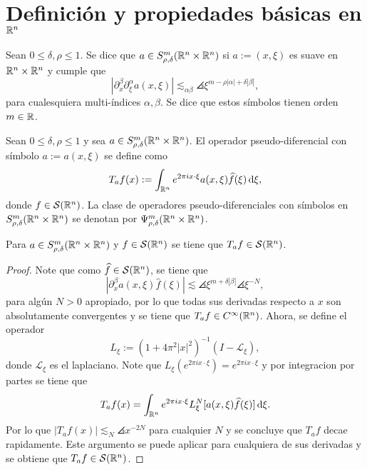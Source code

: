 \section{Definición y propiedades básicas en $\mathbb{R}^n$}
\begin{definition}
	Sean $0\leq\delta,\rho\leq1$. Se dice que $a \in S^m_{\rho,\delta}(\mathbb{R}^n\times\mathbb{R}^n)$ si $a:=(x,\xi)$ es suave en $\mathbb{R}^n\times\mathbb{R}^n$ y cumple que
	\begin{equation*}
		|\partial^\beta_x\partial^\alpha_\xi a(x, \xi)| \lesssim_{\alpha\beta}\angles{\xi}^{m-\rho|\alpha|+\delta|\beta|},
	\end{equation*}
	para cualesquiera multi-índices $\alpha,\beta$. Se dice que estos símbolos tienen orden $m\in\mathbb{R}$.
\end{definition}
\begin{definition}
	Sean $0\leq\delta,\rho\leq1$ y sea $a \in S^m_{\rho,\delta}(\mathbb{R}^n\times\mathbb{R}^n)$. El operador pseudo-diferencial con símbolo $a:=a(x,\xi)$ se define como
	\begin{equation*}
		T_af(x):= \int_{\mathbb{R}^n} e^{2\pi ix\cdot\xi} a(x, \xi)\widehat{f}(\xi)\mathop{}\!\mathrm{d} \xi,
	\end{equation*}
	donde $f\in\mathcal{S}(\mathbb{R}^n)$. La clase de operadores pseudo-diferenciales con símbolos en $S^m_{\rho,\delta}(\mathbb{R}^n\times\mathbb{R}^n)$ se denotan por $\Psi^m_{\rho,\delta}(\mathbb{R}^n\times\mathbb{R}^n)$.
\end{definition}
\begin{proposition}
	Para $a \in S^m_{\rho,\delta}(\mathbb{R}^n\times\mathbb{R}^n)$ y $f\in\mathcal{S}(\mathbb{R}^n)$ se tiene que $T_af\in\mathcal{S}(\mathbb{R}^n)$.
\end{proposition}
\begin{proof}
	Note que como $\widehat{f}\in\mathcal{S}(\mathbb{R}^n)$, se tiene que 
	\[|\partial^\beta_xa(x, \xi)\widehat{f}(\xi)|\lesssim \angles{\xi}^{m+\delta|\beta|}\angles{\xi}^{-N} ,\]
	para algún $N>0$ apropiado, por lo que todas sus derivadas respecto a $x$ son absolutamente convergentes y se tiene que $T_af\in C^\infty(\mathbb{R}^n)$. Ahora, se define el operador 
	\begin{equation*}
		L_\xi := (1 + 4\pi^2|x|^2)^{-1}(I-\mathcal{L}_\xi),
	\end{equation*}
	donde $\mathcal{L}_\xi$ es el laplaciano. Note que $ L_\xi(e^{2\pi ix\cdot\xi}) = e^{2\pi ix\cdot \xi} $ y por integracion por partes se tiene que
	\begin{equation*}
		T_af(x) = \int_{\mathbb{R}^n} e^{2\pi ix\cdot \xi}L_\xi^N [a(x,\xi)\widehat{f}(\xi)] \mathop{}\!\mathrm{d} \xi.
	\end{equation*}
	Por lo que $|T_af(x)| \lesssim_N \angles{x}^{-2N}$ para cualquier $N$ y se concluye que $T_af$ decae rapidamente. Este argumento se puede aplicar para cualquiera de sus derivadas y se obtiene que $T_af\in\mathcal{S}(\mathbb{R}^n)$.
\end{proof}
